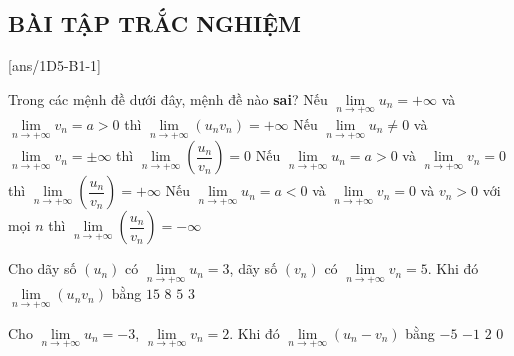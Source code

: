 \subsection{BÀI TẬP TRẮC NGHIỆM}
\TN
\setcounter{ex}{0}
[ans/1D5-B1-1]
\begin{ex}%
	Trong các mệnh đề dưới đây, mệnh đề nào \textbf{sai}?
	\choice
	{Nếu $\lim\limits_{n\to +\infty} u_n = +\infty$ và $\lim\limits_{n\to +\infty} v_n = a > 0$ thì $\lim\limits_{n\to +\infty}\left(u_n v_n\right)=+\infty$}
	{Nếu $\lim\limits_{n\to +\infty} u_n \neq 0$ và $\lim\limits_{n\to +\infty} v_n = \pm \infty$ thì $\lim\limits_{n\to +\infty}\left(\dfrac{u_n}{v_n}\right)=0$}
	{\True Nếu $\lim\limits_{n\to +\infty} u_n = a > 0$ và $\lim\limits_{n\to +\infty} v_n = 0$ thì $\lim\limits_{n\to +\infty}\left(\dfrac{u_n}{v_n}\right)=+\infty$}
	{Nếu $\lim\limits_{n\to +\infty} u_n = a < 0$ và $\lim\limits_{n\to +\infty} v_n = 0$ và $v_n > 0$ với mọi $n$ thì $\lim\limits_{n\to +\infty}\left(\dfrac{u_n}{v_n}\right)=-\infty$}
\end{ex}	

\begin{ex}%
	Cho dãy số $\left( u_n\right)$ có $\lim\limits_{n\to +\infty} u_n=3$, dãy số  $\left( v_n\right)$ có $\lim\limits_{n\to +\infty} v_n=5$. Khi đó $\lim\limits_{n\to +\infty} \left(u_n v_n\right)$ bằng
	\choice
	{\True $15$}
	{$8$}
	{$5$}
	{$3$}
\end{ex}	

\begin{ex}%
	Cho $\lim\limits_{n\to +\infty} u_n=-3$, $\lim\limits_{n\to +\infty} v_n=2$. Khi đó $\lim\limits_{n\to +\infty} \left(u_n -v_n\right)$ bằng
	\choice
	{\True $-5$}
	{$-1$}
	{$2$}
	{$0$}
\end{ex}	

